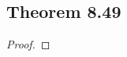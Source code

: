 \documentclass[../../main.tex]{subfiles}
\begin{document}
\subsection{Theorem 8.49}
\begin{wts}

\end{wts}
\begin{proof}

\end{proof}
\end{document}
